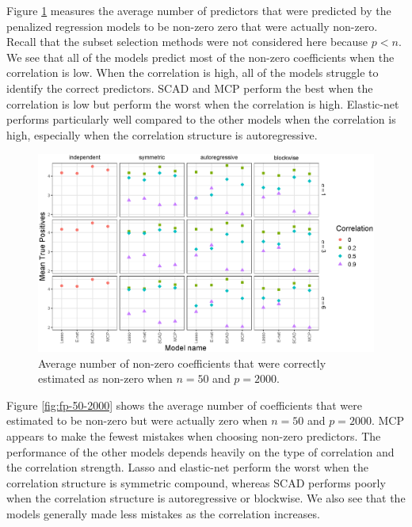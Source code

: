 \documentclass{article}
\begin{document}
Figure \ref{fig:tp-50-2000} measures the average number of predictors that were predicted by the penalized regression models to be non-zero zero that were actually non-zero. Recall that the subset selection methods were not considered here because $p < n$. We see that all of the models predict most of the non-zero coefficients when the correlation is low. When the correlation is high, all of the models struggle to identify the correct predictors. SCAD and MCP perform the best when the correlation is low but perform the worst when the correlation is high. Elastic-net performs particularly well compared to the other models when the correlation is high, especially when the correlation structure is autoregressive.

\begin{figure}[h!]
	\centering
	\includegraphics[width = \textwidth]{images/facet-tp/facet_tp_50_2000.eps}
	\caption{Average number of non-zero coefficients that were correctly estimated as non-zero when $n = 50$ and $p = 2000$.}
	\label{fig:tp-50-2000}
\end{figure}

Figure \ref{fig:fp-50-2000} shows the average number of coefficients that were estimated to be non-zero but were actually zero when $n = 50$ and $p = 2000$. MCP appears to make the fewest mistakes when choosing non-zero predictors. The performance of the other models depends heavily on the type of correlation and the correlation strength. Lasso and elastic-net perform the worst when the correlation structure is symmetric compound, whereas SCAD performs poorly when the correlation structure is autoregressive or blockwise. We also see that the models generally made less mistakes as the correlation increases.
\end{document}
